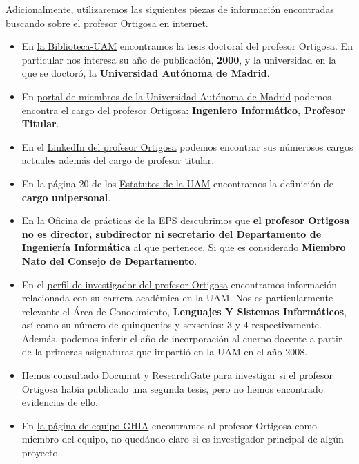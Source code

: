 \documentclass[a4paper]{article}
\begin{document}
Adicionalmente, utilizaremos las siguientes piezas de información encontradas buscando sobre el profesor Ortigosa en internet.

\begin{itemize}
	\item En \href{https://repositorio.uam.es/handle/10486/726}{la Biblioteca-UAM} encontramos la tesis doctoral del profesor Ortigosa. En particular nos interesa su año de publicación, \textbf{2000}, y la universidad en la que se doctoró, la \textbf{Universidad Autónoma de Madrid}.
	\item En \href{https://www.icfs-uam.es/miembros/}{portal de miembros de la Universidad Autónoma de Madrid} podemos encontra el cargo del profesor Ortigosa: \textbf{Ingeniero Informático, Profesor Titular}.
	\item En el \href{https://www.linkedin.com/in/alvaroortigosa/?originalSubdomain=es}{LinkedIn del profesor Ortigosa} podemos encontrar sus númerosos cargos actuales además del cargo de profesor titular.
	\item En la página 20 de los  \href{https://transparencia.uam.es/wp-content/uploads/2019/05/Estatutos.pdf}{Estatutos de la UAM} encontramos la definición de \textbf{cargo unipersonal}.
	\item En la \href{https://www.uam.es/EPS/OrganosDeDireccion/1242660085957.htm?language=es&nodepath=?rganos%20de%20Direcci?n}{Oficina de prácticas de la EPS} descubrimos que \textbf{el profesor Ortigosa no es director, subdirector ni secretario del Departamento de Ingeniería Informática} al que pertenece. Si que es considerado \textbf{Miembro Nato del Consejo de Departamento}.
	\item En el \href{https://portalcientifico.uam.es/ipublic/agent-personal/profile/iMarinaID/04-261195}{perfil de investigador del profesor Ortigosa} encontramos información relacionada con su carrera académica en la UAM. Nos es particularmente relevante el Área de Conocimiento, \textbf{Lenguajes Y Sistemas Informáticos}, así como su número de quinquenios y sexsenios: 3 y 4 respectivamente. Además, podemos inferir el año de incorporación al cuerpo docente a partir de la primeras asignaturas que impartió en la UAM en el año 2008.
	\item Hemos consultado \href{https://documat.unirioja.es/servlet/autor?codigo=3113302#Tesis}{Documat} y \href{https://www.researchgate.net/profile/Alvaro-Ortigosa}{ResearchGate} para investigar si el profesor Ortigosa había publicado una segunda tesis, pero no hemos encontrado evidencias de ello.
	\item En \href{https://vghia.ii.uam.es/members}{la página de equipo GHIA} encontramos al profesor Ortigosa como miembro del equipo, no quedándo claro si es investigador principal de algún proyecto.
\end{itemize}
\end{document}
